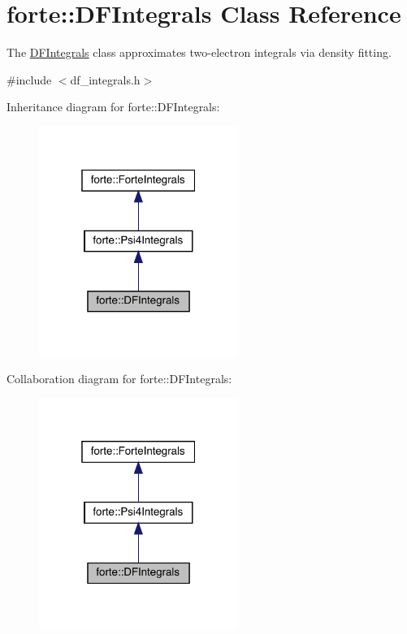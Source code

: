 \hypertarget{classforte_1_1_d_f_integrals}{}\section{forte\+:\+:D\+F\+Integrals Class Reference}
\label{classforte_1_1_d_f_integrals}


The \mbox{\hyperlink{classforte_1_1_d_f_integrals}{D\+F\+Integrals}} class approximates two-\/electron integrals via density fitting.  




{\ttfamily \#include $<$df\+\_\+integrals.\+h$>$}



Inheritance diagram for forte\+:\+:D\+F\+Integrals\+:
\nopagebreak
\begin{figure}[H]
\begin{center}
\leavevmode
\includegraphics[width=184pt]{classforte_1_1_d_f_integrals__inherit__graph}
\end{center}
\end{figure}


Collaboration diagram for forte\+:\+:D\+F\+Integrals\+:
\nopagebreak
\begin{figure}[H]
\begin{center}
\leavevmode
\includegraphics[width=184pt]{classforte_1_1_d_f_integrals__coll__graph}
\end{center}
\end{figure}
